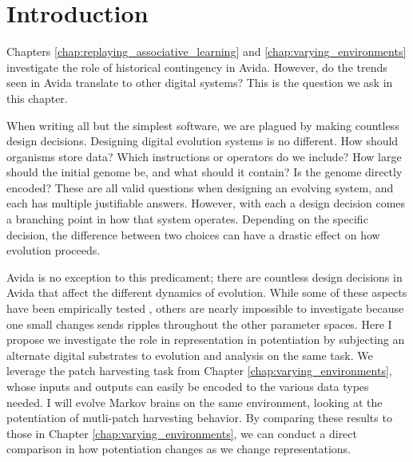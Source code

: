 \section{Introduction}

Chapters \ref{chap:replaying_associative_learning} and \ref{chap:varying_environments} investigate the role of historical contingency in Avida. 
However, do the trends seen in Avida translate to other digital systems? 
This is the question we ask in this chapter.  

When writing all but the simplest software, we are plagued by making countless design decisions. 
Designing digital evolution systems is no different. 
How should organisms store data? 
Which instructions or operators do we include?
How large should the initial genome be, and what should it contain?
Is the genome directly encoded?
These are all valid questions when designing an evolving system, and each has multiple justifiable answers. 
However, with each a design decision comes a branching point in how that system operates. 
Depending on the specific decision, the difference between two choices can have a drastic effect on how evolution proceeds. 

Avida is no exception to this predicament; there are countless design decisions in Avida that affect the different dynamics of evolution. 
While some of these aspects have been empirically tested \citep{ofriaDesignEvolvableComputer2002, brysonUnderstandingEvolutionaryPotential2013}, others are nearly impossible to investigate because one small changes sends ripples throughout the other parameter spaces. 
Here I propose we investigate the role in representation in potentiation by subjecting an alternate digital substrates to evolution and analysis on the same task. 
We leverage the patch harvesting task from Chapter \ref{chap:varying_environments}, whose inputs and outputs can easily be encoded to the various data types needed. 
I will evolve Markov brains \citep{hintzeMarkovBrainsTechnical2017} on the same environment, looking at the potentiation of mutli-patch harvesting behavior. 
By comparing these results to those in Chapter \ref{chap:varying_environments}, we can conduct a direct comparison in how potentiation changes as we change representations. 

